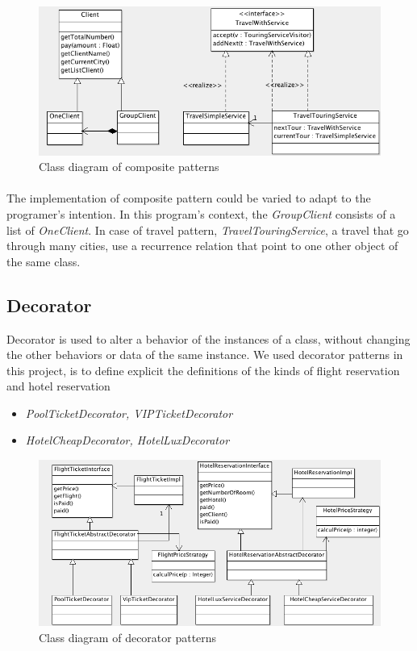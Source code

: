 \begin{figure}[h]
\centering
\includegraphics[width=12cm]{project/images/composite.png}
\caption{Class diagram of composite patterns}
\end{figure}

\paragraph{}
The implementation of composite pattern could be varied to adapt to the programer's intention. In this program's context, the \textit{GroupClient} consists of a list of \textit{OneClient}. In case of travel pattern, \textit{TravelTouringService}, a travel that go through many cities, use a recurrence relation that point to one other object of the same class.

\newpage
\subsection{Decorator}
Decorator is used to alter a behavior of the instances of a class, without changing the other behaviors or data of the same instance. We used decorator patterns in this project, is to define explicit the definitions of the kinds of flight reservation and hotel reservation

\begin{itemize}
\item \textit{PoolTicketDecorator, VIPTicketDecorator}
\item \textit{HotelCheapDecorator, HotelLuxDecorator}
\end{itemize}

\begin{figure}[h]
\centering
\includegraphics[width=15cm]{project/images/decorator.png}
\caption{Class diagram of decorator patterns}
\end{figure}

